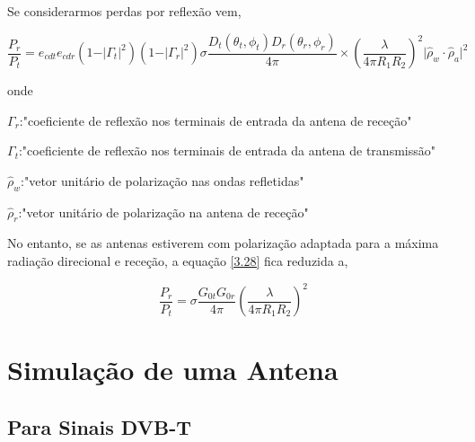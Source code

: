 Se considerarmos perdas por reflexão vem,  

\begin{equation} \label{3.28}
\dfrac{P_{r}}{P_{t}}=e_{cdt}e_{cdr}\left( 1-\vert\Gamma_{t}\vert^{2}\right)\left( 1-\vert\Gamma_{r}\vert^{2}\right)\sigma \dfrac{D_{t}\left( \theta_{t},\phi_{t}\right)D_{r}\left( \theta_{r},\phi_{r}\right) }{4\pi}\times\left( \dfrac{\lambda}{4\pi R_{1}R_{2}}\right)^{2}\vert\hat{\rho}_{w}\cdot \hat{\rho}_{a}\vert^{2}
\end{equation}

onde \par 
$\Gamma_{r}$:"coeficiente de reflexão nos terminais de entrada da antena de receção" \par
$\Gamma_{t}$:"coeficiente de reflexão nos terminais de entrada da antena de transmissão" \par
$\hat{\rho}_{w}$:"vetor unitário de polarização nas ondas refletidas"\par
$\hat{\rho}_{r}$:"vetor unitário de polarização na antena de receção"\par

No entanto, se as antenas estiverem com polarização adaptada para a máxima radiação direcional e receção, a equação \ref{3.28} fica reduzida a,

\begin{equation} \label{3.29}
\dfrac{P_{r}}{P_{t}}=\sigma \dfrac{G_{0t}G_{0r}}{4\pi}\left( \dfrac{\lambda}{4\pi R_{1}R_{2}}\right)^{2} 
\end{equation}








\section{Simulação de uma Antena}


\subsection{Para Sinais DVB-T}

